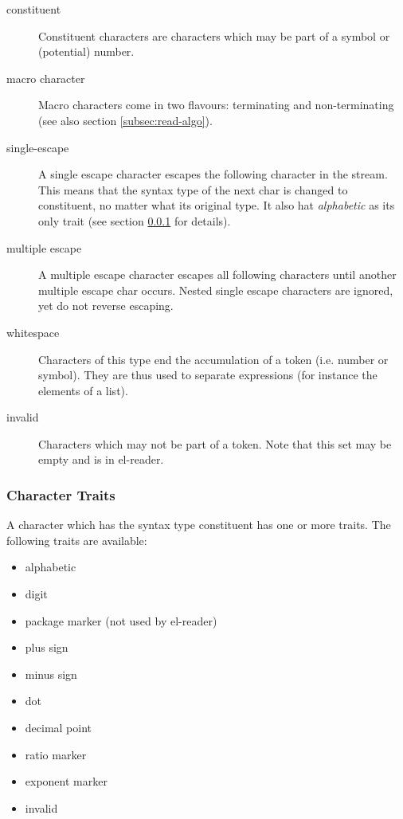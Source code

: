 \documentclass[a4paper,10pt,twoside]{article}
\newcommand{\elr}{el-reader}
\begin{document}
\begin{description}
\item[constituent] Constituent characters are characters which may be part of a
  symbol or (potential) number.
\item[macro character] Macro characters come in two flavours: terminating and
  non-terminating (see also section \ref{subsec:read-algo}).
\item[single-escape] A single escape character escapes the following character
  in the stream.  This means that the syntax type of the next char is changed to
  constituent, no matter what its original type.  It also hat \emph{alphabetic}
  as its only trait (see section \ref{subsubsec:traits} for details).
\item[multiple escape] A multiple escape character escapes all following
  characters until another multiple escape char occurs.  Nested single escape
  characters are ignored, yet do not reverse escaping.
\item[whitespace] Characters of this type end the accumulation of a token
  (i.e. number or symbol).  They are thus used to separate expressions (for
  instance the elements of a list).
\item[invalid] Characters which may not be part of a token.  Note that this set
  may be empty and is in \elr{}.
\end{description}

\subsubsection{Character Traits}
\label{subsubsec:traits}

A character which has the syntax type constituent has one or more traits.
The following traits are available:

\begin{itemize}
\item alphabetic
\item digit
\item package marker (not used by \elr{})
\item plus sign
\item minus sign
\item dot
\item decimal point
\item ratio marker
\item exponent marker
\item invalid
\end{itemize}
\end{document}
